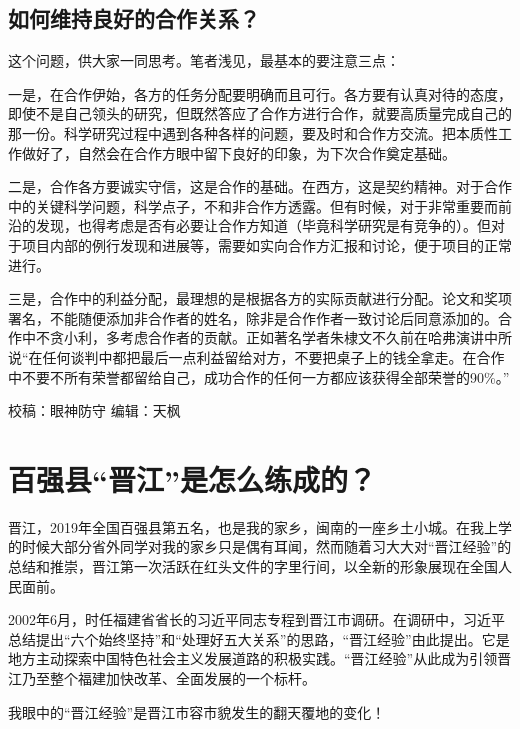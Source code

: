 \documentclass[]{book}
\begin{document}
\hypertarget{ux5982ux4f55ux7ef4ux6301ux826fux597dux7684ux5408ux4f5cux5173ux7cfb}{%
\subsection{如何维持良好的合作关系？}\label{ux5982ux4f55ux7ef4ux6301ux826fux597dux7684ux5408ux4f5cux5173ux7cfb}}

这个问题，供大家一同思考。笔者浅见，最基本的要注意三点：

一是，在合作伊始，各方的任务分配要明确而且可行。各方要有认真对待的态度，即使不是自己领头的研究，但既然答应了合作方进行合作，就要高质量完成自己的那一份。科学研究过程中遇到各种各样的问题，要及时和合作方交流。把本质性工作做好了，自然会在合作方眼中留下良好的印象，为下次合作奠定基础。

二是，合作各方要诚实守信，这是合作的基础。在西方，这是契约精神。对于合作中的关键科学问题，科学点子，不和非合作方透露。但有时候，对于非常重要而前沿的发现，也得考虑是否有必要让合作方知道（毕竟科学研究是有竞争的）。但对于项目内部的例行发现和进展等，需要如实向合作方汇报和讨论，便于项目的正常进行。

三是，合作中的利益分配，最理想的是根据各方的实际贡献进行分配。论文和奖项署名，不能随便添加非合作者的姓名，除非是合作作者一致讨论后同意添加的。合作中不贪小利，多考虑合作者的贡献。正如著名学者朱棣文不久前在哈弗演讲中所说``在任何谈判中都把最后一点利益留给对方，不要把桌子上的钱全拿走。在合作中不要不所有荣誉都留给自己，成功合作的任何一方都应该获得全部荣誉的90\%。''

校稿：眼神防守
编辑：天枫

\hypertarget{ux767eux5f3aux53bfux664bux6c5fux662fux600eux4e48ux7ec3ux6210ux7684}{%
\section{百强县``晋江''是怎么练成的？}\label{ux767eux5f3aux53bfux664bux6c5fux662fux600eux4e48ux7ec3ux6210ux7684}}

晋江，2019年全国百强县第五名，也是我的家乡，闽南的一座乡土小城。在我上学的时候大部分省外同学对我的家乡只是偶有耳闻，然而随着习大大对``晋江经验''的总结和推崇，晋江第一次活跃在红头文件的字里行间，以全新的形象展现在全国人民面前。

2002年6月，时任福建省省长的习近平同志专程到晋江市调研。在调研中，习近平总结提出``六个始终坚持''和``处理好五大关系''的思路，``晋江经验''由此提出。它是地方主动探索中国特色社会主义发展道路的积极实践。``晋江经验''从此成为引领晋江乃至整个福建加快改革、全面发展的一个标杆。

我眼中的``晋江经验''是晋江市容市貌发生的翻天覆地的变化！
\end{document}
